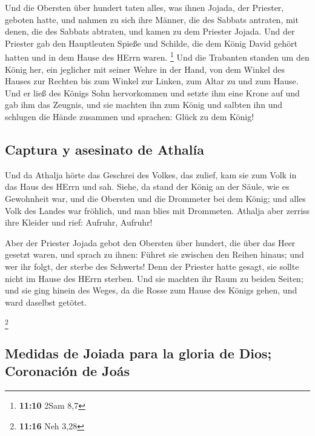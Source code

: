  Und die Obersten über hundert taten alles, was ihnen
Jojada, der Priester, geboten hatte, und nahmen zu sich ihre Männer, die
des Sabbats antraten, mit denen, die des Sabbats abtraten, und kamen zu
dem Priester Jojada.  Und der Priester gab den
Hauptleuten Spieße und Schilde, die dem König David gehört hatten und in
dem Hause des HErrn waren. \footnote{\textbf{11:10} 2Sam 8,7}
 Und die Trabanten standen um den König her, ein
jeglicher mit seiner Wehre in der Hand, von dem Winkel des Hauses zur
Rechten bis zum Winkel zur Linken, zum Altar zu und zum Hause.
 Und er ließ des Königs Sohn hervorkommen und setzte ihm
eine Krone auf und gab ihm das Zeugnis, und sie machten ihn zum König
und salbten ihn und schlugen die Hände zusammen und sprachen: Glück zu
dem König!

\hypertarget{captura-y-asesinato-de-athaluxeda}{%
\subsection{Captura y asesinato de
Athalía}\label{captura-y-asesinato-de-athaluxeda}}

 Und da Athalja hörte das Geschrei des Volkes, das
zulief, kam sie zum Volk in das Haus des HErrn  und sah.
Siehe, da stand der König an der Säule, wie es Gewohnheit war, und die
Obersten und die Drommeter bei dem König; und alles Volk des Landes war
fröhlich, und man blies mit Drommeten. Athalja aber zerriss ihre Kleider
und rief: Aufruhr, Aufruhr!

 Aber der Priester Jojada gebot den Obersten über
hundert, die über das Heer gesetzt waren, und sprach zu ihnen: Führet
sie zwischen den Reihen hinaus; und wer ihr folgt, der sterbe des
Schwerts! Denn der Priester hatte gesagt, sie sollte nicht im Hause des
HErrn sterben.  Und sie machten ihr Raum zu beiden
Seiten; und sie ging hinein des Weges, da die Rosse zum Hause des Königs
gehen, und ward daselbst getötet.

\footnote{\textbf{11:16} Neh 3,28}

\hypertarget{medidas-de-joiada-para-la-gloria-de-dios-coronaciuxf3n-de-jouxe1s}{%
\subsection{Medidas de Joiada para la gloria de Dios; Coronación de
Joás}\label{medidas-de-joiada-para-la-gloria-de-dios-coronaciuxf3n-de-jouxe1s}}

